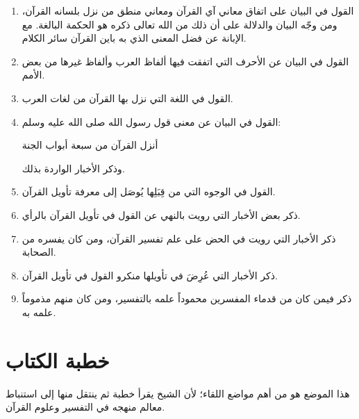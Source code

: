 \begin{enumerate}
    \item القول في البيان على اتفاق معاني آي القرآن ومعاني منطق من نزل بلسانه القرآن، ومن وجّه البيان والدلالة على أن ذلك من الله تعالى ذكره هو الحكمة البالغة. مع الإبانة عن فضل المعنى الذي به باين القرآن سائر الكلام.
    \item القول في البيان عن الأحرف التي اتفقت فيها ألفاظ العرب وألفاظ غيرها من بعض الأمم.
    \item القول في اللغة التي نزل بها القرآن من لغات العرب.
    \item القول في البيان عن معنى قول رسول الله صلى الله عليه وسلم: \begin{hadith}أنزل القرآن من سبعة أبواب الجنة\end{hadith} وذكر الأخبار الواردة بذلك.
    \item القول في الوجوه التي من قِبَلِها يُوصَل إلى معرفة تأويل القرآن.
    \item ذكر بعض الأخبار التي رويت بالنهي عن القول في تأويل القرآن بالرأي.
    \item ذكر الأخبار التي رويت في الحض على علم تفسير القرآن، ومن كان يفسره من الصحابة.
    \item ذكر الأخبار التي عُرِضَ في تأويلها منكرو القول في تأويل القرآن.
    \item ذكر فيمن كان من قدماء المفسرين محموداً علمه بالتفسير، ومن كان منهم مذموماً علمه به.
\end{enumerate}

\separator

\section{خطبة الكتاب}
\noindent هذا الموضع هو من أهم مواضع اللقاء؛ لأن الشيخ يقرأ خطبة  ثم ينتقل منها إلى استنباط معالم منهجه في التفسير وعلوم القرآن.

  

